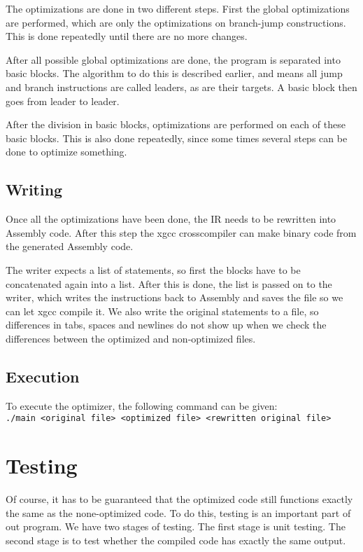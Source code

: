 \documentclass[10pt,a4paper]{article}
\begin{document}
The optimizations are done in two different steps. First the global
optimizations are performed, which are only the optimizations on branch-jump
constructions. This is done repeatedly until there are no more changes.

After all possible global optimizations are done, the program is separated into
basic blocks. The algorithm to do this is described earlier, and means all
jump and branch instructions are called leaders, as are their targets. A basic
block then goes from leader to leader.

After the division in basic blocks, optimizations are performed on each of
these basic blocks. This is also done repeatedly, since some times several
steps can be done to optimize something.

\subsection{Writing}

Once all the optimizations have been done, the IR needs to be rewritten into
Assembly code. After this step the xgcc crosscompiler can make binary code from
the generated Assembly code.

The writer expects a list of statements, so first the blocks have to be
concatenated again into a list. After this is done, the list is passed on to
the writer, which writes the instructions back to Assembly and saves the file
so we can let xgcc compile it. We also write the original statements to a file,
so differences in tabs, spaces and newlines do not show up when we check the
differences between the optimized and non-optimized files.

\subsection{Execution}

To execute the optimizer, the following command can be given:\\
\texttt{./main <original file> <optimized file> <rewritten original file>}

\section{Testing}

Of course, it has to be guaranteed that the optimized code still functions
exactly the same as the none-optimized code. To do this, testing is an
important part of out program. We have two stages of testing. The first stage
is unit testing. The second stage is to test whether the compiled code has
exactly the same output.
\end{document}
